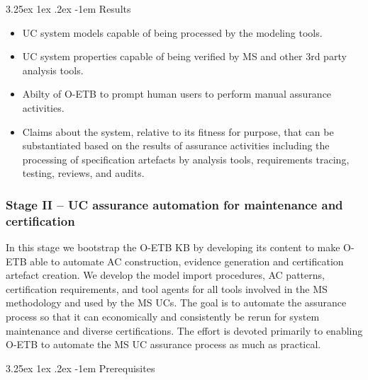 \documentclass[12pt,twoside,a4paper]{article}
\makeatletter
\renewcommand\paragraph{\@startsection{paragraph}{5}{\z@}%
  {3.25ex \@plus1ex \@minus.2ex}%
  {-1em}%
  {\normalfont\normalsize\bfseries}}
\makeatother
\begin{document}
\hypertarget{results}{%
\paragraph{Results}\label{results}}

\begin{itemize}
\item
  UC system models capable of being processed by the modeling tools.
\item
  UC system properties capable of being verified by MS and other 3rd party analysis tools.
\item
  Abilty of O-ETB to prompt human users to perform manual assurance activities.
\item
  Claims about the system, relative to its fitness for purpose, that can be substantiated based on the results of assurance activities including the processing of specification artefacts by analysis tools, requirements tracing, testing, reviews, and audits.
\end{itemize}

\hypertarget{stage-ii-uc-assurance-automation-for-maintenance-and-certification}{%
\subsubsection{Stage II -- UC assurance automation for maintenance and certification}\label{stage-ii-uc-assurance-automation-for-maintenance-and-certification}}

In this stage we bootstrap the O-ETB KB by developing its content to make O-ETB able to automate AC construction, evidence generation and certification artefact creation. We develop the model import procedures, AC patterns, certification requirements, and tool agents for all tools involved in the MS methodology and used by the MS UCs. The goal is to automate the assurance process so that it can economically and consistently be rerun for system maintenance and diverse certifications. The effort is devoted primarily to enabling O-ETB to automate the MS UC assurance process as much as practical.

\hypertarget{prerequisites-2}{%
\paragraph{Prerequisites}\label{prerequisites-2}}
\end{document}
